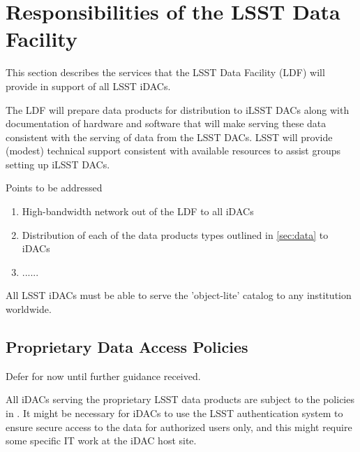 \section{Responsibilities of the LSST Data Facility}

This section describes the services that the LSST Data Facility (LDF) will provide in support of all LSST iDACs.

The LDF will prepare data products for distribution to iLSST DACs along with documentation of hardware and software that will make serving these data consistent with the serving of data from the LSST DACs. LSST will provide (modest) technical support consistent with available resources to assist groups setting up iLSST DACs. 

Points to be addressed
\begin{enumerate}
\item High-bandwidth network out of the LDF to all iDACs
\item Distribution of each of the data products types outlined in \ref{sec:data} to iDACs
\item ......
\end{enumerate}

All LSST  iDACs must be able to serve the 'object-lite' catalog to any institution worldwide.

\subsection{Proprietary Data Access Policies}
{\color{red}Defer for now until further guidance received.} \newline

All iDACs serving the proprietary LSST data products are subject to the policies in . It might be necessary for iDACs to use the LSST authentication system to ensure secure access to the data for authorized users only, and this might require some specific IT work at the iDAC host site.


